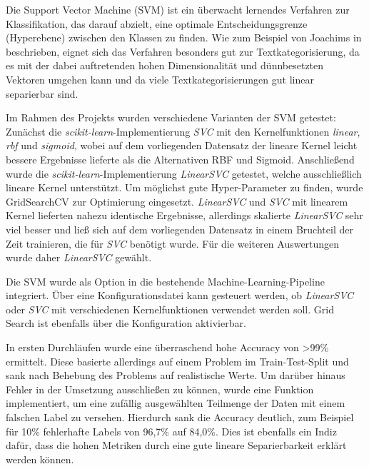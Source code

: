 Die Support Vector Machine (SVM) ist ein überwacht lernendes Verfahren zur Klassifikation, das darauf abzielt, eine optimale Entscheidungsgrenze (Hyperebene) zwischen den Klassen zu finden. Wie zum Beispiel von Joachims in \cite{textCategorizationWithSVM} beschrieben, eignet sich das Verfahren besonders gut zur Textkategorisierung, da es mit der dabei auftretenden hohen Dimensionalität und dünnbesetzten Vektoren umgehen kann und da viele Textkategorisierungen gut linear separierbar sind.

Im Rahmen des Projekts wurden verschiedene Varianten der SVM getestet: Zunächst die \textit{scikit-learn}-Implementierung \textit{SVC} mit den Kernelfunktionen \textit{linear}, \textit{rbf} und \textit{sigmoid}, wobei auf dem vorliegenden Datensatz der lineare Kernel leicht bessere Ergebnisse lieferte als die Alternativen RBF und Sigmoid. Anschließend wurde die \textit{scikit-learn}-Implementierung \textit{LinearSVC} getestet, welche ausschließlich lineare Kernel unterstützt.  Um möglichst gute Hyper-Parameter zu finden, wurde GridSearchCV zur Optimierung eingesetzt. \textit{LinearSVC} und \textit{SVC} mit linearem Kernel lieferten nahezu identische Ergebnisse, allerdings skalierte \textit{LinearSVC} sehr viel besser und ließ sich auf dem vorliegenden Datensatz in einem Bruchteil der Zeit trainieren, die für \textit{SVC} benötigt wurde. Für die weiteren Auswertungen wurde daher \textit{LinearSVC} gewählt.

Die SVM wurde als Option in die bestehende Machine-Learning-Pipeline integriert. Über eine Konfigurationsdatei kann gesteuert werden, ob \textit{LinearSVC} oder \textit{SVC} mit verschiedenen Kernelfunktionen verwendet werden soll. Grid Search ist ebenfalls über die Konfiguration aktivierbar.

In ersten Durchläufen wurde eine überraschend hohe Accuracy von >99\% ermittelt. Diese basierte allerdings auf einem Problem im Train-Test-Split und sank nach Behebung des Problems auf realistische Werte. Um darüber hinaus Fehler in der Umsetzung ausschließen zu können, wurde eine Funktion implementiert, um eine zufällig ausgewählten Teilmenge der Daten mit einem falschen Label zu versehen. Hierdurch sank die Accuracy deutlich, zum Beispiel für 10\% fehlerhafte Labels von 96,7\% auf 84,0\%. Dies ist ebenfalls ein Indiz dafür, dass die hohen Metriken durch eine gute lineare Separierbarkeit erklärt werden können.
